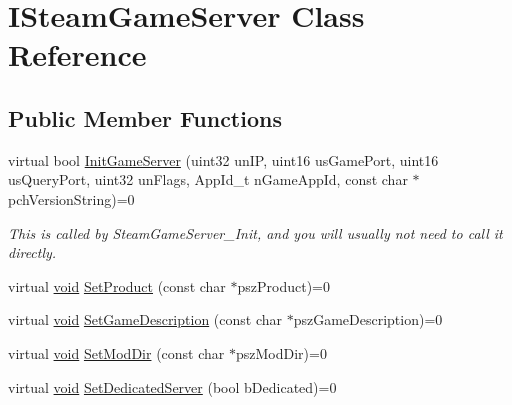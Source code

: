 \hypertarget{classISteamGameServer}{}\section{I\+Steam\+Game\+Server Class Reference}
\label{classISteamGameServer}
\subsection*{Public Member Functions}
\begin{DoxyCompactItemize}
\item 
\hypertarget{classISteamGameServer_ab3070f705e64b3232297ed0ac22ea3d6}{}virtual bool \hyperlink{classISteamGameServer_ab3070f705e64b3232297ed0ac22ea3d6}{Init\+Game\+Server} (uint32 un\+I\+P, uint16 us\+Game\+Port, uint16 us\+Query\+Port, uint32 un\+Flags, App\+Id\+\_\+t n\+Game\+App\+Id, const char $\ast$pch\+Version\+String)=0\label{classISteamGameServer_ab3070f705e64b3232297ed0ac22ea3d6}

\begin{DoxyCompactList}\small\item\em This is called by Steam\+Game\+Server\+\_\+\+Init, and you will usually not need to call it directly. \end{DoxyCompactList}\item 
virtual \hyperlink{SDL__audio_8h_a52835ae37c4bb905b903cbaf5d04b05f}{void} \hyperlink{classISteamGameServer_a372776d31b9693579e5703f2a2ea2e69}{Set\+Product} (const char $\ast$psz\+Product)=0
\item 
virtual \hyperlink{SDL__audio_8h_a52835ae37c4bb905b903cbaf5d04b05f}{void} \hyperlink{classISteamGameServer_a475be416147c6fe13bb3532c829650f2}{Set\+Game\+Description} (const char $\ast$psz\+Game\+Description)=0
\item 
virtual \hyperlink{SDL__audio_8h_a52835ae37c4bb905b903cbaf5d04b05f}{void} \hyperlink{classISteamGameServer_aecfcae1904680ae8d49164b4e4eb5e6f}{Set\+Mod\+Dir} (const char $\ast$psz\+Mod\+Dir)=0
\item 
\hypertarget{classISteamGameServer_a81f53905d4aa5eb8fc6e8d785384c8a9}{}virtual \hyperlink{SDL__audio_8h_a52835ae37c4bb905b903cbaf5d04b05f}{void} \hyperlink{classISteamGameServer_a81f53905d4aa5eb8fc6e8d785384c8a9}{Set\+Dedicated\+Server} (bool b\+Dedicated)=0\label{classISteamGameServer_a81f53905d4aa5eb8fc6e8d785384c8a9}


\end{DoxyCompactItemize}
